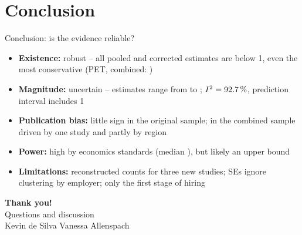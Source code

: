 \section{Conclusion}

\begin{frame}{Conclusion: is the evidence reliable?}
  \begin{itemize}
    \item \textbf{Existence:} robust -- all pooled and corrected estimates
      are below 1, even the most conservative (PET, combined:
      \maORpetComb{} \maCIpetComb)
    \item \textbf{Magnitude:} uncertain -- estimates range from \maORsub{}
      to \maORpetComb; $I^2 = 92.7\,\%$, prediction interval \maPIre{}
      includes 1
    \item \textbf{Publication bias:} little sign in the original sample; in
      the combined sample driven by one study and partly by region
    \item \textbf{Power:} high by economics standards (median \maMedPower),
      but likely an upper bound
    \item \textbf{Limitations:} reconstructed counts for three new studies;
      SEs ignore clustering by employer; only the first stage of hiring
  \end{itemize}
\end{frame}

\begin{frame}[c]
  \centering
  {\Large\bfseries Thank you!}\\[1em]
  Questions and discussion\\[2.5em]
  {\small Kevin de Silva \quad\textbar\quad Vanessa Allenspach}
\end{frame}

